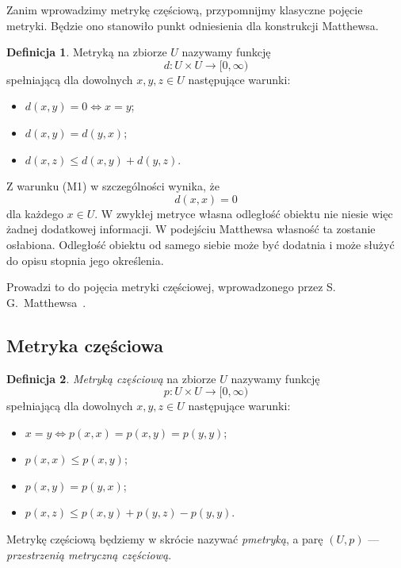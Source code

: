 \documentclass[11pt,a4paper]{article}
\theoremstyle{definition}
\newtheorem{definicja}{Definicja}[section]
\theoremstyle{plain}
\begin{document}
Zanim wprowadzimy metrykę częściową, przypomnijmy klasyczne pojęcie
metryki. Będzie ono stanowiło punkt odniesienia dla konstrukcji
Matthewsa.

\begin{definicja}\label{def:metryka}
	Metryką na zbiorze $U$ nazywamy funkcję
	\[
	d:U\times U\to [0, \infty)
	\]
	spełniającą dla dowolnych $x,y,z\in U$ następujące warunki:
	\begin{itemize}[leftmargin=1.5cm]
		\item[(M1)] $d(x,y)=0 \iff x=y$;
		\item[(M2)] $d(x,y)=d(y,x)$;
		\item[(M3)] $d(x,z)\leq d(x,y)+d(y,z)$.
	\end{itemize}
\end{definicja}

Z warunku (M1) w szczególności wynika, że
\[
d(x,x)=0
\]
dla każdego $x\in U$. W zwykłej metryce własna odległość obiektu nie
niesie więc żadnej dodatkowej informacji. W podejściu Matthewsa własność
ta zostanie osłabiona. Odległość obiektu od samego siebie może być dodatnia
i może służyć do opisu stopnia jego określenia.

Prowadzi to do pojęcia metryki częściowej, wprowadzonego przez
S.\,G.~Matthewsa~\cite{matthews1994}.

\subsection{Metryka częściowa}

\begin{definicja}\label{def:metryka_czesciowa}
	\emph{Metryką częściową} na zbiorze $U$ nazywamy funkcję
	\[
	p:U\times U\to [0, \infty)
	\]
	spełniającą dla dowolnych $x,y,z\in U$ następujące warunki:
	\begin{itemize}[leftmargin=1.5cm]
		\item[(P1)] $x=y \iff p(x,x)=p(x,y)=p(y,y)$;
		\item[(P2)] $p(x,x)\leq p(x,y)$;
		\item[(P3)] $p(x,y)=p(y,x)$;
		\item[(P4)] $p(x,z)\leq p(x,y)+p(y,z)-p(y,y)$.
	\end{itemize}
	Metrykę częściową będziemy w skrócie nazywać \emph{pmetryką}, a parę
	$(U,p)$ --- \emph{przestrzenią metryczną częściową}.
\end{definicja}
\end{document}
